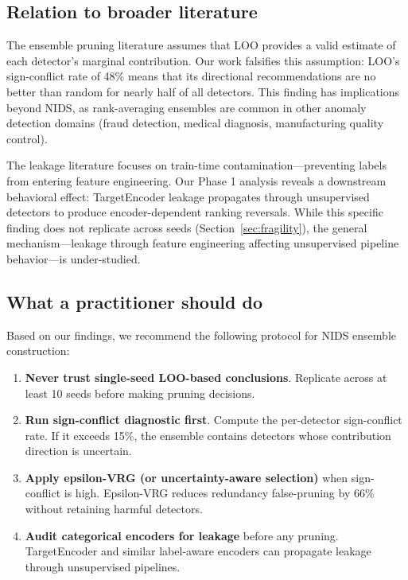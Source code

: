 \subsection{Relation to broader literature}

The ensemble pruning literature assumes that LOO provides a valid estimate of each detector's marginal contribution. Our work falsifies this assumption: LOO's sign-conflict rate of 48\% means that its directional recommendations are no better than random for nearly half of all detectors. This finding has implications beyond NIDS, as rank-averaging ensembles are common in other anomaly detection domains (fraud detection, medical diagnosis, manufacturing quality control).

The leakage literature focuses on train-time contamination---preventing labels from entering feature engineering. Our Phase 1 analysis reveals a downstream behavioral effect: TargetEncoder leakage propagates through unsupervised detectors to produce encoder-dependent ranking reversals. While this specific finding does not replicate across seeds (Section~\ref{sec:fragility}), the general mechanism---leakage through feature engineering affecting unsupervised pipeline behavior---is under-studied.

\subsection{What a practitioner should do}

Based on our findings, we recommend the following protocol for NIDS ensemble construction:

\begin{enumerate}
\item \textbf{Never trust single-seed LOO-based conclusions}. Replicate across at least 10 seeds before making pruning decisions.
\item \textbf{Run sign-conflict diagnostic first}. Compute the per-detector sign-conflict rate. If it exceeds 15\%, the ensemble contains detectors whose contribution direction is uncertain.
\item \textbf{Apply epsilon-VRG (or uncertainty-aware selection)} when sign-conflict is high. Epsilon-VRG reduces redundancy false-pruning by 66\% without retaining harmful detectors.
\item \textbf{Audit categorical encoders for leakage} before any pruning. TargetEncoder and similar label-aware encoders can propagate leakage through unsupervised pipelines.
\end{enumerate}

